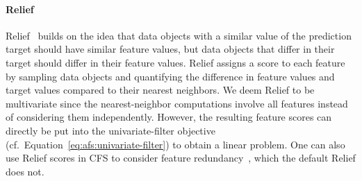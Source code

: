 \documentclass{article}
\theoremstyle{definition}
\begin{document}
\paragraph{Relief}

Relief~\cite{kira1992feature, robnik1997adaptation} builds on the idea that data objects with a similar value of the prediction target should have similar feature values, but data objects that differ in their target should differ in their feature values.
Relief assigns a score to each feature by sampling data objects and quantifying the difference in feature values and target values compared to their nearest neighbors.
We deem Relief to be multivariate since the nearest-neighbor computations involve all features instead of considering them independently.
However, the resulting feature scores can directly be put into the univariate-filter objective (cf.~Equation~\ref{eq:afs:univariate-filter}) to obtain a linear problem.
One can also use Relief scores in CFS to consider feature redundancy~\cite{hall1999correlation, hall2000correlation}, which the default Relief does not.

\renewcommand*{\bibfont}{\small} %
\printbibliography
\end{document}
